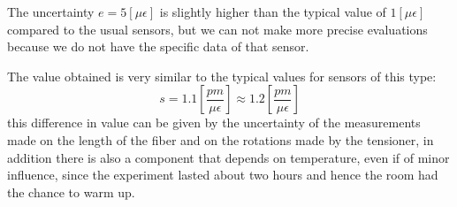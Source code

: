 The uncertainty $e = 5 [\mu\epsilon]$ is slightly higher than the typical value of $1 [\mu\epsilon]$ compared to the usual sensors, but we can not make more precise evaluations because we do not have the specific data of that sensor.

The value obtained is very similar to the typical values for sensors of this type:
$$s =  1.1 \left[\frac{pm}{\mu\epsilon}\right] \approx 1.2 \left[\frac{pm}{\mu\epsilon}\right]$$
this difference in value can be given by the uncertainty of the measurements made on the length of the fiber and on the rotations made by the tensioner, in addition there is also a component that depends on temperature, even if of minor influence, since the experiment lasted about two hours and hence the room had the chance to warm up.
